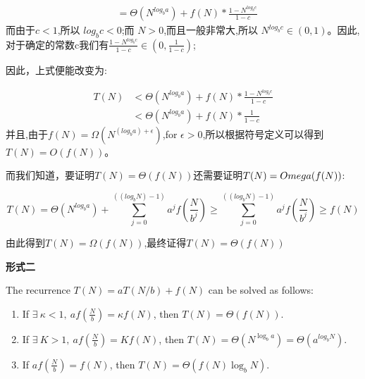 \documentclass{article}
\begin{document}
\begin{enumerate}
\begin{align*}
            & = \Theta(N^{log_b a}) + f(N) * \frac{1-N^{log_b c}}{1-c}
    \end{align*}
    而由于$c < 1$,所以 $log_b c < 0$;而 $N > 0$,而且一般非常大,所以 $N^{log_b c} \in (0,1)$。因此,对于确定的常数c我们有$\frac{1-N^{log_b c}}{1-c} \in (0,\frac{1}{1-c})$;\par
    因此，上式便能改变为:\par
    \begin{align*}
        T(N)& < \Theta(N^{log_b a}) + f(N) * \frac{1-N^{log_b c}}{1-c}\\
            & < \Theta(N^{log_b a}) + f(N) * \frac{1}{1-c}
    \end{align*}
    并且,由于$f(N) = \Omega(N^{(log_b a)+\epsilon})$,for $\epsilon > 0$,所以根据符号定义可以得到$T(N) = O(f(N))$。\par
    而我们知道，要证明$T(N) = \Theta(f(N))$还需要证明$T(N) = \\Omega(f(N))$:\par
    $$T(N) = \Theta(N^{log_b a}) + \sum_{j=0}^{((log_b N) -1)} a^j f(\frac{N}{b^j}) \ge \sum_{j=0}^{((log_b N) -1)} a^j f(\frac{N}{b^j}) \ge f(N)$$\par
    由此得到$T(N) = \Omega(f(N))$,最终证得$T(N) = \Theta(f(N))$
\end{enumerate}

\textbf{形式二}\par
The recurrence $T(N)=aT(N/b)+f(N)$ can be solved as follows: 
\begin{enumerate}\small
    \item If $\exists\ \kappa<1,\ af(\frac{N}{b})=\kappa f(N)$, then $T(N)=\Theta(f(N))$. 
    \item If $\exists\ K>1,\ af(\frac{N}{b})=Kf(N)$, then $T(N)=\Theta(N^{\log_b a}) = \Theta(a^{log_b N})$. 
    \item If $af(\frac{N}{b})=f(N)$, then $T(N)=\Theta(f(N)\log_b N)$. 
\end{enumerate}
\end{document}
